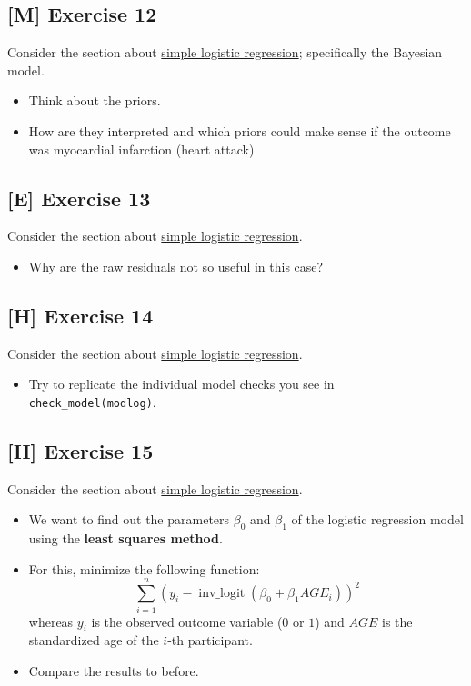 \documentclass[
]{book}
\providecommand{\tightlist}{%
  \setlength{\itemsep}{0pt}\setlength{\parskip}{0pt}}
\begin{document}
\subsection{{[}M{]} Exercise 12}\label{exercise12_LMM}

Consider the section about \hyperref[simple_logistic_regression]{simple logistic regression};
specifically the Bayesian model.

\begin{itemize}
\tightlist
\item
  Think about the priors.
\item
  How are they interpreted and which priors could make sense if the outcome was
  myocardial infarction (heart attack)
\end{itemize}

\subsection{{[}E{]} Exercise 13}\label{exercise13_LMM}

Consider the section about \hyperref[simple_logistic_regression]{simple logistic regression}.

\begin{itemize}
\tightlist
\item
  Why are the raw residuals not so useful in this case?
\end{itemize}

\subsection{{[}H{]} Exercise 14}\label{exercise14_LMM}

Consider the section about \hyperref[simple_logistic_regression]{simple logistic regression}.

\begin{itemize}
\tightlist
\item
  Try to replicate the individual model checks you see in \texttt{check\_model(modlog)}.
\end{itemize}

\subsection{{[}H{]} Exercise 15}\label{exercise15_LMM}

Consider the section about \hyperref[simple_logistic_regression]{simple logistic regression}.

\begin{itemize}
\tightlist
\item
  We want to find out the parameters \(\beta_0\) and \(\beta_1\) of the logistic regression model
  using the \textbf{least squares method}.
\item
  For this, minimize the following function:
  \[\sum_{i=1}^n (y_i - \operatorname{inv\_logit}(\beta_0 + \beta_1 AGE_i))^2\]
  whereas \(y_i\) is the observed outcome variable (\(0\) or \(1\)) and
  \(AGE\) is the standardized age of the \(i\)-th participant.
\item
  Compare the results to before.
\end{itemize}
\end{document}
